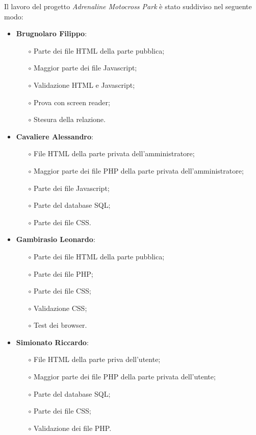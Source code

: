 Il lavoro del progetto \textit{Adrenaline Motocross Park} è stato suddiviso nel seguente modo:
\begin{itemize}
    \item \textbf{Brugnolaro Filippo}:
        \begin{itemize}
            \item[$\circ$] Parte dei file HTML della parte pubblica;
            \item[$\circ$] Maggior parte dei file Javascript;
            \item[$\circ$] Validazione HTML e Javascript;
            \item[$\circ$] Prova con screen reader;
            \item[$\circ$] Stesura della relazione.
        \end{itemize}
    \item \textbf{Cavaliere Alessandro}:
        \begin{itemize}
            \item[$\circ$] File HTML della parte privata dell'amministratore;
            \item[$\circ$] Maggior parte dei file PHP della parte privata dell'amministratore;
            \item[$\circ$] Parte dei file Javascript;
            \item[$\circ$] Parte del database SQL;
            \item[$\circ$] Parte dei file CSS.
        \end{itemize}
    \item \textbf{Gambirasio Leonardo}:
        \begin{itemize}
            \item[$\circ$] Parte dei file HTML della parte pubblica;
            \item[$\circ$] Parte dei file PHP;
            \item[$\circ$] Parte dei file CSS;
            \item[$\circ$] Validazione CSS;
            \item[$\circ$] Test dei browser.
        \end{itemize}
    \item \textbf{Simionato Riccardo}:
        \begin{itemize}
            \item[$\circ$] File HTML della parte priva dell'utente;
            \item[$\circ$] Maggior parte dei file PHP della parte privata dell'utente;
            \item[$\circ$] Parte del database SQL;
            \item[$\circ$] Parte dei file CSS;
            \item[$\circ$] Validazione dei file PHP.
        \end{itemize}
\end{itemize}